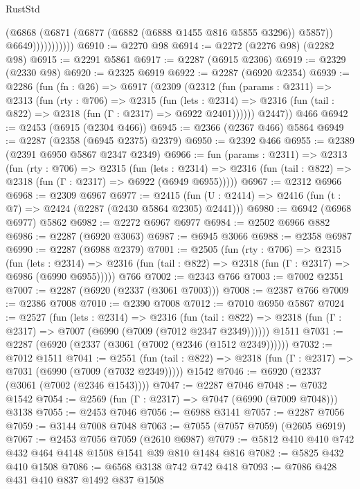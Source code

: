 \begin{lexlean}{RustStd}
\begin{coremodule}
                        (@6868
                          (@6871 (@6877 (@6882 (@6888 @1455 @816 @5855 @3296)) @5857))
                          @6649)))))))))))
@6910 := @2270 @98
@6914 := @2272 (@2276 @98) (@2282 @98)
@6915 := @2291 @5861
@6917 := @2287 (@6915 @2306)
@6919 := @2329 (@2330 @98)
@6920 := @2325 @6919
@6922 := @2287 (@6920 @2354)
@6939 := @2286
    (fun (fn : @26) =>
    @6917
      (@2309
        (@2312
          (fun (params : @2311) =>
          @2313
            (fun (rty : @706) =>
            @2315
              (fun (lets : @2314) =>
              @2316 (fun (tail : @822) => @2318 (fun (Γ : @2317) => @6922 @2401))))))
        @2447))
    @466
@6942 := @2453 (@6915 (@2304 @466))
@6945 := @2366 (@2367 @466) @5864
@6949 := @2287 (@2358 (@6945 @2375) @2379)
@6950 := @2392 @466
@6955 := @2389 (@2391 @6950 @5867 @2347 @2349)
@6966 := fun (params : @2311) =>
  @2313
    (fun (rty : @706) =>
    @2315
      (fun (lets : @2314) =>
      @2316 (fun (tail : @822) => @2318 (fun (Γ : @2317) => @6922 (@6949 @6955)))))
@6967 := @2312 @6966
@6968 := @2309 @6967
@6977 := @2415 (fun (U : @2414) => @2416 (fun (t : @7) => @2424 (@2287 (@2430 @5864 @2305) @2441)))
@6980 := @6942 (@6968 @6977) @5862
@6982 := @2272 @6967 @6977
@6984 := @2502 @6966 @882
@6986 := @2287 (@6920 @3063)
@6987 := @6945 @3066
@6988 := @2358 @6987
@6990 := @2287 (@6988 @2379)
@7001 := @2505
    (fun (rty : @706) =>
    @2315
      (fun (lets : @2314) =>
      @2316 (fun (tail : @822) => @2318 (fun (Γ : @2317) => @6986 (@6990 @6955)))))
    @766
@7002 := @2343 @766
@7003 := @7002 @2351
@7007 := @2287 (@6920 (@2337 (@3061 @7003)))
@7008 := @2387 @766
@7009 := @2386 @7008
@7010 := @2390 @7008
@7012 := @7010 @6950 @5867
@7024 := @2527
    (fun (lets : @2314) =>
    @2316
      (fun (tail : @822) => @2318 (fun (Γ : @2317) => @7007 (@6990 (@7009 (@7012 @2347 @2349))))))
    @1511
@7031 := @2287 (@6920 (@2337 (@3061 (@7002 (@2346 (@1512 @2349))))))
@7032 := @7012 @1511
@7041 := @2551
    (fun (tail : @822) => @2318 (fun (Γ : @2317) => @7031 (@6990 (@7009 (@7032 @2349)))))
    @1542
@7046 := @6920 (@2337 (@3061 (@7002 (@2346 @1543))))
@7047 := @2287 @7046
@7048 := @7032 @1542
@7054 := @2569 (fun (Γ : @2317) => @7047 (@6990 (@7009 @7048))) @3138
@7055 := @2453 @7046
@7056 := @6988 @3141
@7057 := @2287 @7056
@7059 := @3144 @7008 @7048
@7063 := @7055 (@7057 @7059) (@2605 @6919)
@7067 := @2453 @7056 @7059 (@2610 @6987)
@7079 := @5812 @410 @410 @742 @432 @464 @4148 @1508 @1541 @39 @810 @1484 @816
@7082 := @5825 @432 @410 @1508
@7086 := @6568 @3138 @742 @742 @418
@7093 := @7086 @428 @431 @410 @837 @1492 @837 @1508

\end{coremodule}
\end{lexlean}
